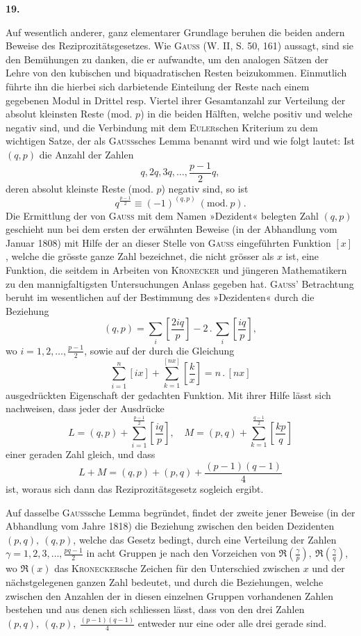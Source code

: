 \begin{center}\bfseries 19.\end{center}
\noindent\hspace*{\parindent}Auf wesentlich anderer, ganz elementarer Grundlage beruhen die beiden andern Beweise des Reziprozitätsgesetzes. Wie \textsc{Gauss} (W. II, S. 50, 161) aussagt, sind sie den Bemühungen zu danken, die er aufwandte, um den analogen Sätzen der Lehre von den kubischen und biquadratischen Resten beizukommen. Einmutlich führte ihn die hierbei sich darbietende Einteilung der Reste nach einem gegebenen Modul in Drittel resp. Viertel ihrer Gesamtanzahl zur Verteilung der absolut kleinsten Reste (mod. \(p\)) in die beiden Hälften, welche positiv und welche negativ sind, und die Verbindung mit dem \textsc{Euler}schen Kriterium zu dem wichtigen Satze, der als \textsc{Gauss}sches Lemma benannt wird und wie folgt lautet: Ist \((q,p)\) die Anzahl der Zahlen
\[
q,2q,3q,\ldots,\frac{p-1}{2}q,
\]
deren absolut kleinste Reste (mod. \(p\)) negativ sind, so ist
\[
q^{\frac{p-1}{2}}\equiv(-1)^{(q,p)}\ (\mathrm{mod.}\ p).
\]
Die Ermittlung der von \textsc{Gauss} mit dem Namen »Dezident« belegten Zahl \((q,p)\) geschieht nun bei dem ersten der erwähnten Beweise (in der Abhandlung vom Januar 1808) mit Hilfe der an dieser Stelle von \textsc{Gauss} eingeführten Funktion \([x]\), welche die grösste ganze Zahl bezeichnet, die nicht grösser als \(x\) ist, eine Funktion, die seitdem in Arbeiten von \textsc{Kronecker} und jüngeren Mathematikern zu den mannigfaltigsten Untersuchungen Anlass gegeben hat. \textsc{Gauss}’ Betrachtung beruht im wesentlichen auf der Bestimmung des »Dezidenten« durch die Beziehung
\[
(q,p)=\sum_i\left[\frac{2iq}{p}\right]-2\mathbin{.}\sum_i\left[\frac{iq}{p}\right],
\]
\newpage{}
\noindent wo \(i=1,2,\ldots,\frac{p-1}{2}\), sowie auf der durch die Gleichung
\[
\sum_{i=1}^n[ix]+\sum_{k=1}^{[nx]}\left[\frac{k}{x}\right]=n\mathbin{.}[nx]
\]
ausgedrückten Eigenschaft der gedachten Funktion. Mit ihrer Hilfe lässt sich nachweisen, dass jeder der Ausdrücke
\[
L=(q,p)+\sum_{i=1}^{\frac{p-1}{2}}\left[\frac{iq}{p}\right],\quad M=(p,q)+\sum_{k=1}^{\frac{q-1}{2}}\left[\frac{kp}{q}\right]
\]
einer geraden Zahl gleich, und dass
\[
L+M=(q,p)+(p,q)+\frac{(p-1)(q-1)}4
\]
ist, woraus sich dann das Reziprozitätsgesetz sogleich ergibt.

Auf dasselbe \textsc{Gauss}sche Lemma begründet, findet der zweite jener Beweise (in der Abhandlung vom Jahre 1818) die Beziehung zwischen den beiden Dezidenten \((p,q),\ (q,p)\), welche das Gesetz bedingt, durch eine Verteilung der Zahlen \(\gamma=1,2,3,\ldots,\frac{pq-1}{2}\) in acht Gruppen je nach den Vorzeichen von \(\mathfrak{R}\left(\frac{\gamma}{p}\right),\ \mathfrak{R}\left(\frac{\gamma}{q}\right)\), wo \(\mathfrak{R}(x)\) das \textsc{Kronecker}sche Zeichen für den Unterschied zwischen \(x\) und der nächstgelegenen ganzen Zahl bedeutet, und durch die Beziehungen, welche zwischen den Anzahlen der in diesen einzelnen Gruppen vorhandenen Zahlen bestehen und aus denen sich schliessen lässt, dass von den drei Zahlen \((p,q),\ (q,p),\ \frac{(p-1)(q-1)}4\) entweder nur eine oder alle drei gerade sind.

